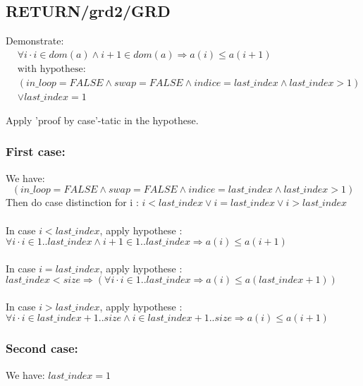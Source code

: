 \subsection{RETURN/grd2/GRD}
Demonstrate:
\begin{align*}
&\forall i \cdot i \in dom(a) \land i+1 \in dom(a) \Rightarrow a(i) \leq a(i+1) \\
&\text{with hypothese: } \\
&(in\_loop=FALSE \land swap=FALSE \land indice=last\_index \land last\_index>1) \\
&\lor last\_index=1
\end{align*}

Apply 'proof by case'-tatic in the hypothese.

\subsubsection{First case: }
We have:
$$
(in\_loop=FALSE \land swap=FALSE \land indice=last\_index \land last\_index>1)
$$
Then do case distinction for i : $i < last\_index \lor i = last\_index \lor i > last\_index$
\paragraph{}
In case $i < last\_index$, apply hypothese : \\
$
\forall i \cdot i \in 1..last\_index \land i+1 \in 1..last\_index \Rightarrow a(i) \leq a(i+1)
$

\paragraph{}
In case $i = last\_index$, apply hypothese :\\
$
last\_index < size \Rightarrow (\forall i \cdot i \in 1..last\_index \Rightarrow a(i) \leq a(last\_index+1))
$

\paragraph{}
In case $i > last\_index$, apply hypothese :\\
$
\forall i \cdot i \in last\_index+1..size \land i \in last\_index+1..size \Rightarrow a(i) \leq a(i+1)
$

\subsubsection{Second case:}
We have: $last\_index = 1$


















